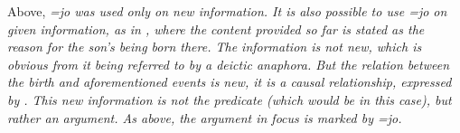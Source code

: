  

% 



Above, \em =jo \em was used only on new information. It is also possible to use \em =jo \em on given information, as in , where the content provided so far is stated as the reason for the son's being born there. The information is not new, which is obvious from it being referred to by a deictic anaphora. But the relation between the birth and aforementioned events is new, it is a causal relationship, expressed by . This new information is not the predicate (which would be  in this case), but rather an argument. As above, the argument in focus is marked by \em =jo\em.



